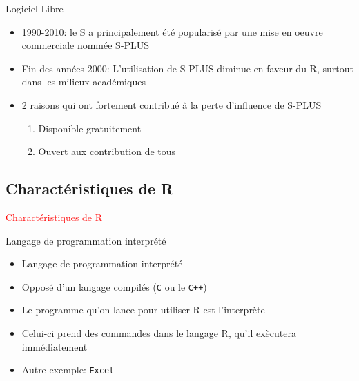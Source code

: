 \documentclass[11pt]{beamer}\usepackage[]{graphicx}\usepackage[]{color}
\newcommand{\code}[1]{\texttt{#1}}
\begin{document}
\begin{frame}{Logiciel Libre}
\begin{itemize}
  \setlength\itemsep{2em}
\item 1990-2010: le S a principalement \'{e}t\'{e} popularis\'{e} par une mise en oeuvre commerciale nomm\'{e}e S-PLUS
\pause \item Fin des ann\'{e}es 2000: L'utilisation de S-PLUS diminue en faveur du R, surtout dans les milieux acad\'{e}miques
\pause \item 2 raisons qui ont fortement contribu\'{e} \`{a} la perte d'influence de S-PLUS
\begin{enumerate}
\item \normalsize Disponible gratuitement
\pause \item Ouvert aux contribution de tous
\end{enumerate}
\end{itemize}
\end{frame}



\subsection{Charact\'{e}ristiques de R}

\begin{frame}
 \begin{center}
  \Huge{\textcolor{red}{Charact\'{e}ristiques de R}}
 \end{center}
\end{frame}



\begin{frame}{Langage de programmation interpr\'{e}t\'{e}}
\begin{itemize}
  \setlength\itemsep{2em}
\item Langage de programmation interpr\'{e}t\'{e}
\pause \item Oppos\'{e} d'un langage compil\'{e}s (\code{C} ou le \code{C++})
\pause \item Le programme qu'on lance pour utiliser R est l'interpr\`{e}te
\pause \item Celui-ci prend des commandes dans le langage R, qu'il ex\`{e}cutera imm\'{e}diatement
\pause \item  Autre exemple: \code{Excel}
\end{itemize}
\end{frame}
\end{document}
